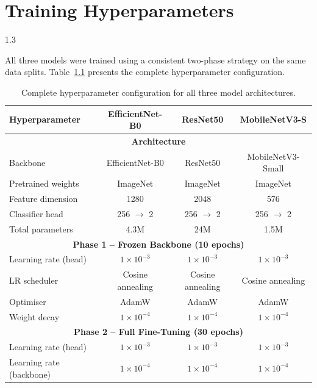 
\chapter{Training Hyperparameters}
\begin{spacing}{1.3}

All three models were trained using a consistent two-phase strategy on the same data splits. Table~\ref{tab:hyper} presents the complete hyperparameter configuration.

\begin{table}[H]
\centering
\caption{Complete hyperparameter configuration for all three model architectures.}
\label{tab:hyper}
\small
\begin{tabular}{lccc}
\toprule
\textbf{Hyperparameter} & \textbf{EfficientNet-B0} & \textbf{ResNet50} & \textbf{MobileNetV3-S} \\
\midrule
\multicolumn{4}{c}{\textbf{Architecture}} \\
\midrule
Backbone              & EfficientNet-B0 & ResNet50          & MobileNetV3-Small \\
Pretrained weights    & ImageNet        & ImageNet          & ImageNet           \\
Feature dimension     & 1280            & 2048              & 576                \\
Classifier head       & 256 $\rightarrow$ 2 & 256 $\rightarrow$ 2 & 256 $\rightarrow$ 2 \\
Total parameters      & 4.3M            & 24M               & 1.5M               \\
\midrule
\multicolumn{4}{c}{\textbf{Phase 1 -- Frozen Backbone (10 epochs)}} \\
\midrule
Learning rate (head)  & $1 \times 10^{-3}$ & $1 \times 10^{-3}$ & $1 \times 10^{-3}$ \\
LR scheduler          & Cosine annealing & Cosine annealing & Cosine annealing \\
Optimiser             & AdamW            & AdamW             & AdamW              \\
Weight decay          & $1 \times 10^{-4}$ & $1 \times 10^{-4}$ & $1 \times 10^{-4}$ \\
\midrule
\multicolumn{4}{c}{\textbf{Phase 2 -- Full Fine-Tuning (30 epochs)}} \\
\midrule
Learning rate (head)      & $1 \times 10^{-3}$ & $1 \times 10^{-3}$ & $1 \times 10^{-3}$ \\
Learning rate (backbone)  & $1 \times 10^{-4}$ & $1 \times 10^{-4}$ & $1 \times 10^{-4}$ \\

\end{tabular}
\end{table}
\end{spacing}
